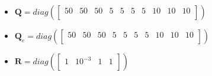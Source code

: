 \documentclass{thesisreport}
\begin{document}
\begin{itemize}
	\item $\bm{Q} = diag(
	\begin{bmatrix}
			50 & 50 & 50 & 5 & 5 & 5 & 5 & 10 & 10 & 10\\
	\end{bmatrix})$
	
	\item $\bm{Q}_e = diag(
	\begin{bmatrix}
			50 & 50 & 50 & 5 & 5 & 5 & 5 & 10 & 10 & 10\\
	\end{bmatrix})$
	
	\item $\bm{R} =diag(
	\begin{bmatrix}
			1 & 10^{-3} & 1 & 1\\
	\end{bmatrix})$
\end{itemize}
	
\end{document}

